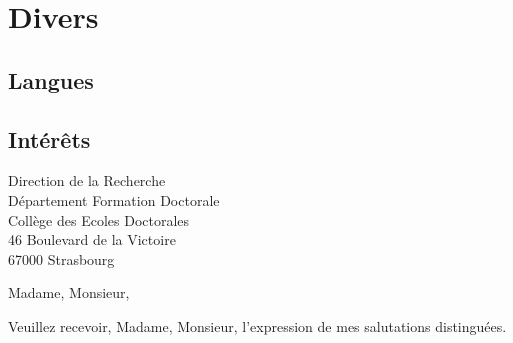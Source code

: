 \documentclass[11pt,a4paper,sans]{moderncv}        %
\begin{document}
\section{Divers}
\begin{minipage}[t]{0.5\maincolumnwidth}
\subsection{Langues}
\end{minipage}
\begin{minipage}[t]{0.5\maincolumnwidth}
\subsection{Intérêts}
\end{minipage}


% 


\clearpage
{Direction de la Recherche\\
Département Formation Doctorale\\
Collège des Ecoles Doctorales\\
46 Boulevard de la Victoire\\
67000 Strasbourg}
\date{\mydateformat\today}
\opening{Madame, Monsieur,}
\closing{Veuillez recevoir, Madame, Monsieur, l'expression de mes salutations distinguées.}
\makelettertitle
\end{document}

